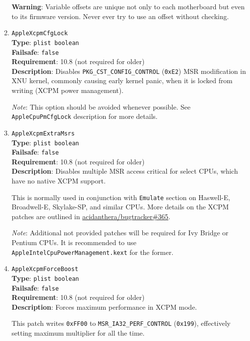 \documentclass[]{article}
\begin{document}
\begin{enumerate}
  \textbf{Warning}: Variable offsets are unique not only to each motherboard but even to its firmware
  version. Never ever try to use an offset without checking.

\item
  \texttt{AppleXcpmCfgLock}\\
  \textbf{Type}: \texttt{plist\ boolean}\\
  \textbf{Failsafe}: \texttt{false}\\
  \textbf{Requirement}: 10.8 (not required for older)\\
  \textbf{Description}: Disables \texttt{PKG\_CST\_CONFIG\_CONTROL} (\texttt{0xE2})
  MSR modification in XNU kernel, commonly causing early kernel panic, when it is
  locked from writing (XCPM power management).

  \emph{Note}: This option should be avoided whenever possible. See \texttt{AppleCpuPmCfgLock}
  description for more details.

\item
  \texttt{AppleXcpmExtraMsrs}\\
  \textbf{Type}: \texttt{plist\ boolean}\\
  \textbf{Failsafe}: \texttt{false}\\
  \textbf{Requirement}: 10.8 (not required for older)\\
  \textbf{Description}: Disables multiple MSR access critical for select CPUs,
  which have no native XCPM support.

  This is normally used in conjunction with \texttt{Emulate} section on Haswell-E,
  Broadwell-E, Skylake-SP, and similar CPUs. More details on the XCPM patches are outlined in
  \href{https://github.com/acidanthera/bugtracker/issues/365}{acidanthera/bugtracker\#365}.

  \emph{Note}: Additional not provided patches will be required for Ivy Bridge or Pentium
  CPUs. It is recommended to use \texttt{AppleIntelCpuPowerManagement.kext} for the former.

\item
  \texttt{AppleXcpmForceBoost}\\
  \textbf{Type}: \texttt{plist\ boolean}\\
  \textbf{Failsafe}: \texttt{false}\\
  \textbf{Requirement}: 10.8 (not required for older)\\
  \textbf{Description}: Forces maximum performance in XCPM mode.

  This patch writes \texttt{0xFF00} to \texttt{MSR\_IA32\_PERF\_CONTROL} (\texttt{0x199}),
  effectively setting maximum multiplier for all the time.


\end{enumerate}
\end{document}
